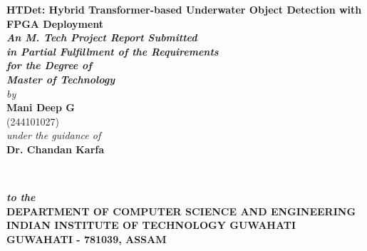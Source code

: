 \begin{titlepage}
\begin{center}
\textheight 15.5in \textwidth 12.5in {\large\sf  \textbf{HTDet: Hybrid Transformer-based Underwater Object Detection with FPGA Deployment}}\\[12ex]
{\small{\textsl{ \textbf{An M. Tech Project Report Submitted \\
in Partial Fulfillment of the Requirements \\
for the Degree of
\\[3ex]\small \bf Master of Technology}}}}\\[16ex] \emph{by} \\[2ex]
{\sf \sf \textbf{Mani Deep G}\\
         (244101027)}\\[1ex]
\emph{under the guidance of}\\[2ex]
{\sf \bf Dr. Chandan Karfa} \\[7ex]

\vspace{1.2in}

 \begin{figure}[!h]
 \hfill
  \hfill \
 \end{figure}

{\sl \bf{to the}} \\[1ex]

{\small\bf DEPARTMENT OF COMPUTER SCIENCE AND ENGINEERING}  \\[1ex]
{\small \bf{INDIAN INSTITUTE OF TECHNOLOGY GUWAHATI \\GUWAHATI - 781039, ASSAM}}
\\[2ex]
\end{center}
\end{titlepage}

